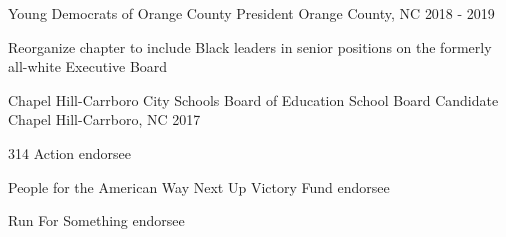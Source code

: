 \begin{cventries}
  \cventry
    {Young Democrats of Orange County} %
    {President} %
    {Orange County, NC} %
    {2018 - 2019} %
    {
      \begin{cvitems} %
        \item {Reorganize chapter to include Black leaders in senior positions on the formerly all-white Executive Board}
      \end{cvitems}
    }	

  \cventry
    {Chapel Hill-Carrboro City Schools Board of Education} %
    {School Board Candidate} %
    {Chapel Hill-Carrboro, NC} %
    {2017} %
    {
      \begin{cvitems} %
        \item {314 Action endorsee}
        \item {People for the American Way Next Up Victory Fund endorsee}
        \item {Run For Something endorsee}
      \end{cvitems}
    }

\end{cventries}
